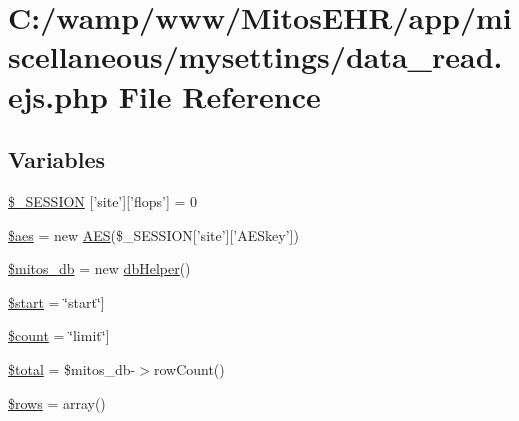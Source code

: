 \hypertarget{miscellaneous_2mysettings_2data__read_8ejs_8php}{\section{\-C\-:/wamp/www/\-Mitos\-E\-H\-R/app/miscellaneous/mysettings/data\-\_\-read.ejs.\-php \-File \-Reference}
\label{miscellaneous_2mysettings_2data__read_8ejs_8php}
}
\subsection*{\-Variables}
\begin{DoxyCompactItemize}
\item 
\hyperlink{miscellaneous_2mysettings_2data__read_8ejs_8php_a99fda8552a3e58235643b79f5af3ded8}{\$\-\_\-\-S\-E\-S\-S\-I\-O\-N} \mbox{[}'site'\mbox{]}\mbox{[}'flops'\mbox{]} = 0
\item 
\hyperlink{miscellaneous_2mysettings_2data__read_8ejs_8php_ab30046a94291cd07e400855e9c786ef3}{\$aes} = new \hyperlink{class_a_e_s}{\-A\-E\-S}(\$\-\_\-\-S\-E\-S\-S\-I\-O\-N\mbox{[}'site'\mbox{]}\mbox{[}'\-A\-E\-Skey'\mbox{]})
\item 
\hyperlink{miscellaneous_2mysettings_2data__read_8ejs_8php_ab5d961f93efe4e2e8d8374f01dd6c65a}{\$mitos\-\_\-db} = new \hyperlink{classdb_helper}{db\-Helper}()
\item 
\hyperlink{miscellaneous_2mysettings_2data__read_8ejs_8php_a50a00e7de77365e00b117e73aa82fb9b}{\$start} = \char`\"{}start\char`\"{}\mbox{]}
\item 
\hyperlink{miscellaneous_2mysettings_2data__read_8ejs_8php_af789423037bbc89dc7c850e761177570}{\$count} = \char`\"{}limit\char`\"{}\mbox{]}
\item 
\hyperlink{miscellaneous_2mysettings_2data__read_8ejs_8php_a241b818f48030b628685b2e5119c5624}{\$total} = \$mitos\-\_\-db-\/$>$row\-Count()
\item 
\hyperlink{miscellaneous_2mysettings_2data__read_8ejs_8php_ace2ec39e7df3899fa8df9640ec274b03}{\$rows} = array()
\end{DoxyCompactItemize}


